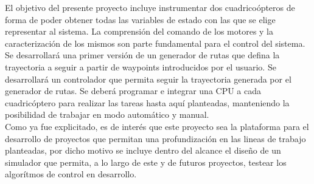 \documentclass[main]{subfiles}
\begin{document}
El objetivo del presente proyecto incluye instrumentar dos cuadrico\'opteros de forma de poder obtener todas las variables de estado con las que se elige representar al sistema. La comprensi\'on del comando de los motores y la caracterizaci\'on de los mismos son parte fundamental para el control del sistema. Se desarrollar\'a una primer versi\'on de un generador de rutas que defina la trayectoria a seguir a partir de waypoints introducidos por el usuario. Se desarrollar\'a un controlador que permita seguir la trayectoria generada por el generador de rutas. Se deber\'a programar e integrar una CPU a cada cuadric\'optero para realizar las tareas hasta aqu\'i planteadas, manteniendo la posibilidad de trabajar en modo autom\'atico y manual.\\

Como ya fue explicitado, es de inter\'es que este proyecto sea la plataforma para el desarrollo de proyectos que permitan una profundizaci\'on en las lineas de trabajo planteadas, por dicho motivo se incluye dentro del alcance el diseño de un simulador que permita, a lo largo de este y de futuros proyectos, testear los algor\'itmos de control en desarrollo.
\end{document}
